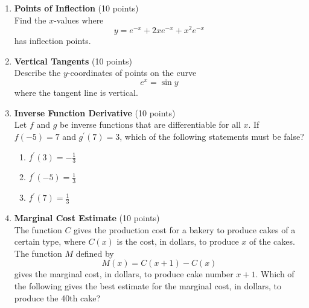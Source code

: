 \begin{enumerate}
  \item \textbf{Points of Inflection} (10 points)\\
  Find the $x$-values where
  \[
    y = e^{-x} + 2x e^{-x} + x^2 e^{-x}
  \]
  has inflection points.
  \begin{subanswer}
  \end{subanswer}

  \item \textbf{Vertical Tangents} (10 points)\\
  Describe the $y$-coordinates of points on the curve
  \[
    e^x = \sin y
  \]
  where the tangent line is vertical.
  \begin{subanswer}
  \end{subanswer}










  \item \textbf{Inverse Function Derivative} (10 points)\\
  Let $f$ and $g$ be inverse functions that are differentiable for all $x$. If $f(-5)=7$ and $g^{\prime}(7)=3$, which of the following statements must be false?
  \begin{enumerate}[label=(\Roman*)]
    \item $f^{\prime}(3)=-\frac{1}{3}$
    \item $f^{\prime}(-5)=\frac{1}{3}$
    \item $f^{\prime}(7)=\frac{1}{3}$
  \end{enumerate}
  \begin{subanswer}
  \end{subanswer}

  \item \textbf{Marginal Cost Estimate} (10 points)\\
  The function $C$ gives the production cost for a bakery to produce cakes of a certain type, where $C(x)$ is the cost, in dollars, to produce $x$ of the cakes. The function $M$ defined by
  \[
    M(x)=C(x+1)-C(x)
  \]
  gives the marginal cost, in dollars, to produce cake number $x+1$. Which of the following gives the best estimate for the marginal cost, in dollars, to produce the 40th cake?
  \begin{subanswer}
  \end{subanswer}


\end{enumerate}
